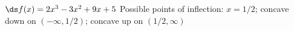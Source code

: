 {$\ds f(x) = 2x^3-3x^2+9x+5$
}
{Possible points of inflection: $x=1/2$;
concave down on $(-\infty,1/2)$;
concave up on $(1/2,\infty)$
}
